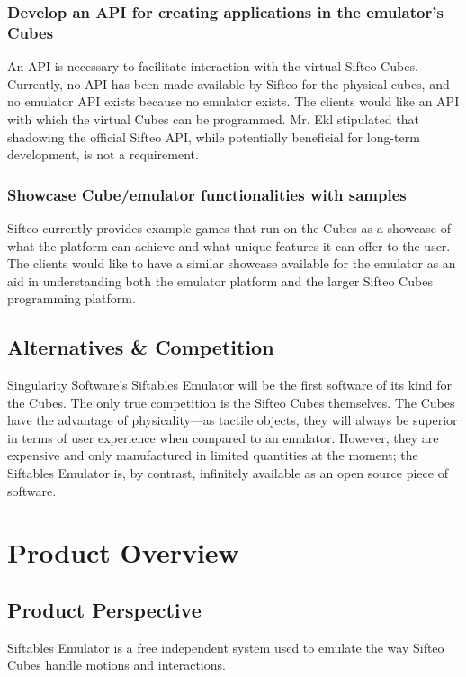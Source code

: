 \documentclass[12pt]{article}
\begin{document}
                          \subsubsection{Develop an API for creating applications in the emulator’s Cubes}
                          An \gls{API} is necessary to facilitate interaction with the virtual Sifteo Cubes. Currently, no \gls{API} has been made available by Sifteo for the physical cubes, and no emulator \gls{API} exists because no emulator exists. The clients would like an \gls{API} with which the virtual Cubes can be programmed. Mr. Ekl stipulated that shadowing the official Sifteo \gls{API}, while potentially beneficial for long-term development, is not a requirement.

                          \subsubsection{Showcase Cube/emulator functionalities with samples}
                          Sifteo currently provides example games that run on the Cubes as a showcase of what the platform can achieve and what unique features it can offer to the user. The clients would like to have a similar showcase available for the emulator as an aid in understanding both the emulator platform and the larger Sifteo Cubes programming platform.

              \subsection{Alternatives \& Competition}
              Singularity Software's Siftables Emulator will be the first software of its kind for the Cubes. The only true competition is the Sifteo Cubes themselves. The Cubes have the advantage of physicality---as tactile objects, they will always be superior in terms of user experience when compared to an emulator. However, they are expensive and only manufactured in limited quantities at the moment; the Siftables Emulator is, by contrast, infinitely available as an \gls{open source} piece of software.

\section{Product Overview}

              \subsection{Product Perspective}
              Siftables Emulator is a free independent system used to emulate the way Sifteo Cubes handle motions and interactions.
\end{document}
